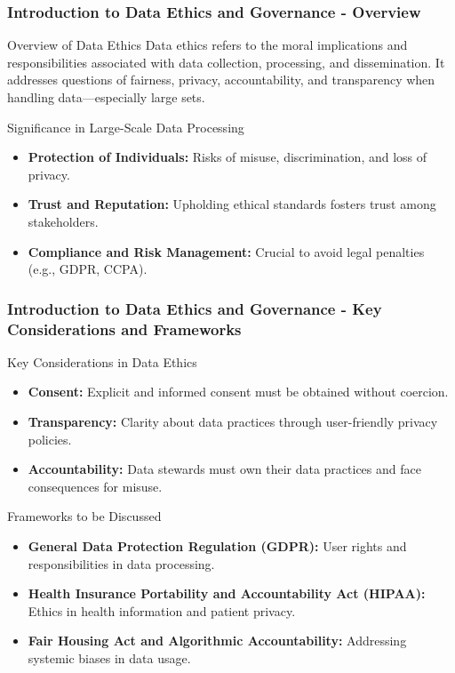 \documentclass[aspectratio=169]{beamer}
\begin{document}
\frame{\titlepage}

\begin{frame}[fragile]
    \frametitle{Introduction to Data Ethics and Governance - Overview}
    
    \begin{block}{Overview of Data Ethics}
        Data ethics refers to the moral implications and responsibilities associated with data collection, processing, and dissemination. 
        It addresses questions of fairness, privacy, accountability, and transparency when handling data—especially large sets.
    \end{block}
    
    \begin{block}{Significance in Large-Scale Data Processing}
        \begin{itemize}
            \item \textbf{Protection of Individuals:} Risks of misuse, discrimination, and loss of privacy.
            \item \textbf{Trust and Reputation:} Upholding ethical standards fosters trust among stakeholders.
            \item \textbf{Compliance and Risk Management:} Crucial to avoid legal penalties (e.g., GDPR, CCPA).
        \end{itemize}
    \end{block}
\end{frame}

\begin{frame}[fragile]
    \frametitle{Introduction to Data Ethics and Governance - Key Considerations and Frameworks}
    
    \begin{block}{Key Considerations in Data Ethics}
        \begin{itemize}
            \item \textbf{Consent:} Explicit and informed consent must be obtained without coercion.
            \item \textbf{Transparency:} Clarity about data practices through user-friendly privacy policies.
            \item \textbf{Accountability:} Data stewards must own their data practices and face consequences for misuse.
        \end{itemize}
    \end{block}
    
    \begin{block}{Frameworks to be Discussed}
        \begin{itemize}
            \item \textbf{General Data Protection Regulation (GDPR):} User rights and responsibilities in data processing.
            \item \textbf{Health Insurance Portability and Accountability Act (HIPAA):} Ethics in health information and patient privacy.
            \item \textbf{Fair Housing Act and Algorithmic Accountability:} Addressing systemic biases in data usage.
        \end{itemize}
    \end{block}
\end{frame}
\end{document}
